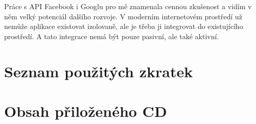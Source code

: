 \documentclass[thesis=B,czech]{FITthesis}[2012/06/26]
\begin{document}
\begin{conclusion}
Práce s API Facebook i Googlu pro mě znamenala cennou zkušenost a vidím v něm velký potenciál dalšího rozvoje. V moderním internetovém prostředí už nemůže aplikace existovat izolovaně, ale je třeba ji integrovat do existujícího prostředí. A tato integrace nemá být pouze pasivní, ale také aktivní.

    



  
%
%
%
%
%

\end{conclusion}




\appendix

\chapter{Seznam použitých zkratek}
\printglossaries


\chapter{Obsah přiloženého CD}


\begin{figure}
\end{figure}
\end{document}
